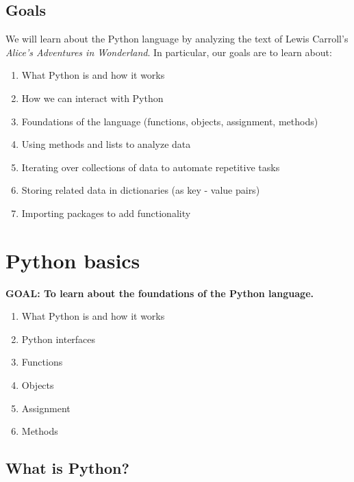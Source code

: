 \documentclass[
]{book}
\providecommand{\tightlist}{%
  \setlength{\itemsep}{0pt}\setlength{\parskip}{0pt}}
\begin{document}
\hypertarget{goals-3}{%
\subsection{Goals}\label{goals-3}}

We will learn about the Python language by analyzing the text of Lewis Carroll's \emph{Alice's Adventures in Wonderland}.
In particular, our goals are to learn about:

\begin{enumerate}
\def\labelenumi{\arabic{enumi}.}
\tightlist
\item
  What Python is and how it works
\item
  How we can interact with Python
\item
  Foundations of the language (functions, objects, assignment, methods)
\item
  Using methods and lists to analyze data
\item
  Iterating over collections of data to automate repetitive tasks
\item
  Storing related data in dictionaries (as key - value pairs)
\item
  Importing packages to add functionality
\end{enumerate}

\hypertarget{python-basics}{%
\section{Python basics}\label{python-basics}}

\textbf{GOAL: To learn about the foundations of the Python language.}

\begin{enumerate}
\def\labelenumi{\arabic{enumi}.}
\tightlist
\item
  What Python is and how it works
\item
  Python interfaces
\item
  Functions
\item
  Objects
\item
  Assignment
\item
  Methods
\end{enumerate}

\hypertarget{what-is-python}{%
\subsection{What is Python?}\label{what-is-python}}
\end{document}
